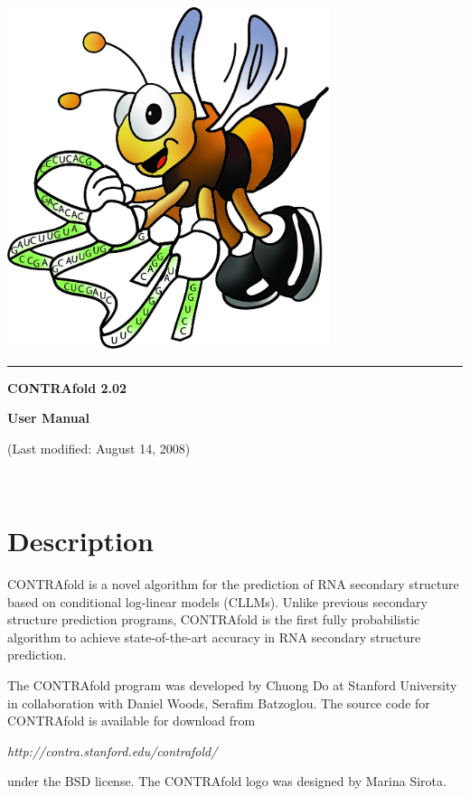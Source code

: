 \documentclass{article}
\begin{document}
  \begin{center}
    \includegraphics[height=10.0cm]{logo.jpg}
  \end{center}
  \rule{5in}{0.15cm}
  \begin{center}
    \textbf{\Huge CONTRAfold 2.02} \\ 
  \end{center}
  \begin{center}
    \textbf{\LARGE User Manual} \\ 
  \end{center}
  \vskip 1.0cm
  \begin{center}
    (Last modified: August 14, 2008)
  \end{center}
  
  \newpage

  \pagestyle{fancy}
  \setcounter{page}{1}

  \ \vskip 1.0cm

  \tableofcontents

  \newpage
  \section{Description}

  CONTRAfold is a novel algorithm for the prediction of RNA secondary
  structure based on conditional log-linear models (CLLMs).  Unlike
  previous secondary structure prediction programs, CONTRAfold is the
  first fully probabilistic algorithm to achieve state-of-the-art
  accuracy in RNA secondary structure prediction.
  
  The CONTRAfold program was developed by Chuong Do at Stanford
  University in collaboration with Daniel Woods, Serafim Batzoglou.
  The source code for CONTRAfold is available for download from
  \begin{center}
    \emph{http://contra.stanford.edu/contrafold/}
  \end{center}
  under the BSD license.  The CONTRAfold logo was designed by Marina
  Sirota.
\end{document}
